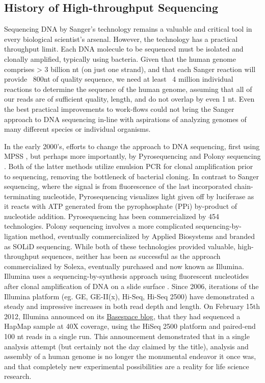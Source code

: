 \subsection{History of High-throughput Sequencing}

Sequencing DNA by Sanger’s technology remains a valuable and critical tool in every biological scientist’s arsenal. However, the technology has a practical throughput limit. Each DNA molecule to be sequenced must be isolated and clonally amplified, typically using bacteria. Given that the human genome \citep{Hattori2005a} comprises > 3 billion nt (on just one strand), and that each Sanger reaction will provide ~800nt of quality sequence, we need at least ~4 million individual reactions to determine the sequence of the human genome, assuming that all of our reads are of sufficient quality, length, and do not overlap by even 1 nt. Even the best practical improvements to work-flows could not bring the Sanger approach to DNA sequencing in-line with aspirations of analyzing genomes of many different species or individual organisms.

In the early 2000’s, efforts to change the approach to DNA sequencing, first using MPSS \citep{Brenner2000a}, but perhaps more importantly, by Pyrosequencing \citep{Ronaghi1998a} and Polony sequencing \citep{Shendure2005}. Both of the latter methods utilize emulsion PCR \citep{Nakano2003a} for clonal amplification prior to sequencing, removing the bottleneck of bacterial cloning. In contrast to Sanger sequencing, where the signal is from fluorescence of the last incorporated chain-terminating nucleotide, Pyrosequencing visualizes light given off by luciferase as it reacts with ATP generated from the pyrophosphate (PPi) by-product of nucleotide addition. Pyrosequencing has been commercialized by 454 technologies. Polony sequencing involves a more complicated sequencing-by-ligation method, eventually commercialized by Applied Biosystems and branded as SOLiD sequencing. While both of these technologies provided valuable, high-throughput sequences, neither has been as successful as the approach commercialized by Solexa, eventually purchased and now known as Illumina.
Illumina uses a sequencing-by-synthesis approach using fluorescent nucleotides after clonal amplification of DNA on a slide surface \citep{Bentley2008}. Since 2006, iterations of the Illumina platform (eg. GE, GE-II(x), Hi-Seq, Hi-Seq 2500) have demonstrated a steady and impressive increases in both read depth and length. On February 15th 2012, Illumina announced on its \href{http://blog.basespace.illumina.com/}{Basespace blog}, that they had sequenced a HapMap sample at 40X coverage, using the HiSeq 2500 platform and paired-end 100 nt reads in a single run. This announcement demonstrated that in a single analysis attempt (but certainly not the day claimed by the title), analysis and assembly of a human genome is no longer the monumental endeavor it once was, and that completely new experimental possibilities are a reality for life science research.

